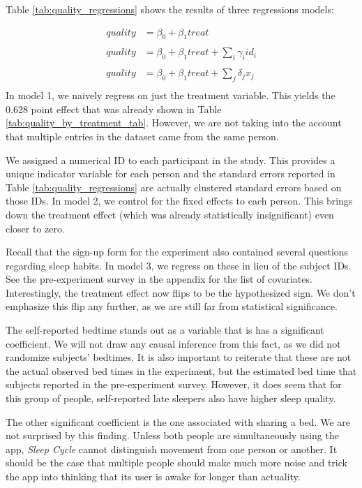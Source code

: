 \documentclass[12pt,]{article}
\begin{document}
Table \ref{tab:quality_regressions} shows the results of three
regressions models:

\[
\begin{aligned}
    quality &= \beta_0 + \beta_1 treat \\\\
    quality &= \beta_0 + \beta_1 treat + \sum_i \gamma_i id_i \\\\
    quality &= \beta_0 + \beta_1 treat + \sum_j \delta_j x_j \\
\end{aligned}
\] In model 1, we naively regress on just the treatment variable. This
yields the 0.628 point effect that was already shown in Table
\ref{tab:quality_by_treatment_tab}. However, we are not taking into the
account that multiple entries in the dataset came from the same person.

We assigned a numerical ID to each participant in the study. This
provides a unique indicator variable for each person and the standard
errors reported in Table \ref{tab:quality_regressions} are actually
clustered standard errors based on those IDs. In model 2, we control for
the fixed effects to each person. This brings down the treatment effect
(which was already statistically insignificant) even closer to zero.

Recall that the sign-up form for the experiment also contained several
questions regarding sleep habits. In model 3, we regress on these in
lieu of the subject IDs. See the pre-experiment survey in the appendix
for the list of covariates. Interestingly, the treatment effect now
flips to be the hypothesized sign. We don't emphasize this flip any
further, as we are still far from statistical significance.

The self-reported bedtime stands out as a variable that is has a
significant coefficient. We will not draw any causal inference from this
fact, as we did not randomize subjects' bedtimes. It is also important
to reiterate that these are not the actual observed bed times in the
experiment, but the estimated bed time that subjects reported in the
pre-experiment survey. However, it does seem that for this group of
people, self-reported late sleepers also have higher sleep quality.

The other significant coefficient is the one associated with sharing a
bed. We are not surprised by this finding. Unless both people are
simultaneously using the app, \emph{Sleep Cycle} cannot distinguish
movement from one person or another. It should be the case that multiple
people should make much more noise and trick the app into thinking that
its user is awake for longer than actuality.
\end{document}
